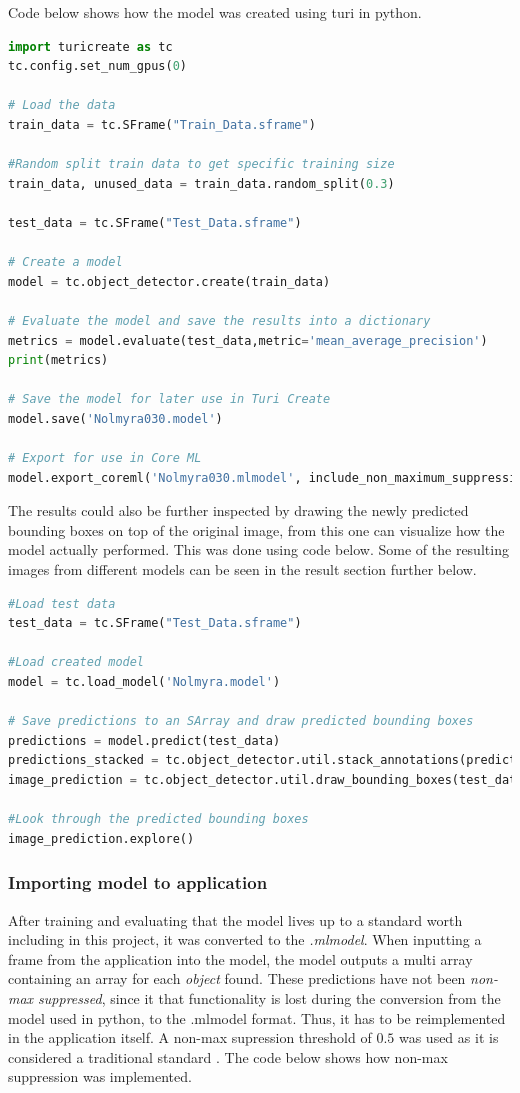 Code below shows how the model was created using turi in python.
\begin{lstlisting}[language=python]
import turicreate as tc
tc.config.set_num_gpus(0)

# Load the data
train_data = tc.SFrame("Train_Data.sframe")

#Random split train data to get specific training size
train_data, unused_data = train_data.random_split(0.3)

test_data = tc.SFrame("Test_Data.sframe")

# Create a model
model = tc.object_detector.create(train_data)

# Evaluate the model and save the results into a dictionary
metrics = model.evaluate(test_data,metric='mean_average_precision')
print(metrics)

# Save the model for later use in Turi Create
model.save('Nolmyra030.model')

# Export for use in Core ML
model.export_coreml('Nolmyra030.mlmodel', include_non_maximum_suppression=False)
\end{lstlisting}
The results could also be further inspected by drawing the newly predicted bounding boxes on top of the original image, from this one can visualize how the model actually performed. This was done using code below. Some of the resulting images from different models can be seen in the result section further below. 

\begin{lstlisting}[language=python]
#Load test data
test_data = tc.SFrame("Test_Data.sframe")

#Load created model
model = tc.load_model('Nolmyra.model')

# Save predictions to an SArray and draw predicted bounding boxes
predictions = model.predict(test_data)
predictions_stacked = tc.object_detector.util.stack_annotations(predictions)
image_prediction = tc.object_detector.util.draw_bounding_boxes(test_data['image'], predictions)

#Look through the predicted bounding boxes
image_prediction.explore()
\end{lstlisting}

\subsubsection{Importing model to application}

After training and evaluating that the model lives up to a standard worth including in this
 project, it was converted to the \textit{.mlmodel}. When inputting a frame from the
application into the model, the model outputs a multi array containing an array for each
  \textit{object} found. These predictions have not been \textit{non-max suppressed}, since it that functionality is lost during the conversion from the model used in python, to the .mlmodel format. Thus, it has to be reimplemented in the application itself. 
  A non-max supression threshold of $0.5$ was used as it is considered a traditional standard \cite{nms}. The code below shows how non-max suppression was implemented. 

